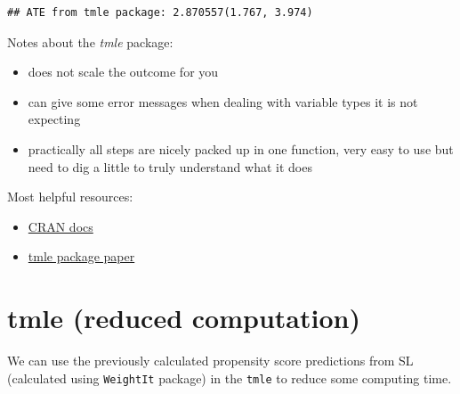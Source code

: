 \documentclass[
]{book}
\newenvironment{Shaded}{\begin{snugshade}}{\end{snugshade}}
\newcommand{\AttributeTok}[1]{\textcolor[rgb]{0.77,0.63,0.00}{#1}}
\newcommand{\FunctionTok}[1]{\textcolor[rgb]{0.00,0.00,0.00}{#1}}
\newcommand{\NormalTok}[1]{#1}
\newcommand{\OtherTok}[1]{\textcolor[rgb]{0.56,0.35,0.01}{#1}}
\newcommand{\SpecialCharTok}[1]{\textcolor[rgb]{0.00,0.00,0.00}{#1}}
\newcommand{\StringTok}[1]{\textcolor[rgb]{0.31,0.60,0.02}{#1}}
\providecommand{\tightlist}{%
  \setlength{\itemsep}{0pt}\setlength{\parskip}{0pt}}
\begin{document}
\begin{Shaded}
\end{Shaded}

\begin{verbatim}
## ATE from tmle package: 2.870557(1.767, 3.974)
\end{verbatim}

Notes about the \emph{tmle} package:

\begin{itemize}
\tightlist
\item
  does not scale the outcome for you
\item
  can give some error messages when dealing with variable types it is not expecting
\item
  practically all steps are nicely packed up in one function, very easy to use but need to dig a little to truly understand what it does
\end{itemize}

Most helpful resources:

\begin{itemize}
\tightlist
\item
  \href{https://cran.r-project.org/web/packages/tmle/tmle.pdf}{CRAN docs}
\item
  \href{https://www.jstatsoft.org/article/view/v051i13}{tmle package paper}
\end{itemize}

\hypertarget{tmle-reduced-computation}{%
\section{tmle (reduced computation)}\label{tmle-reduced-computation}}

We can use the previously calculated propensity score predictions from SL (calculated using \texttt{WeightIt} package) in the \texttt{tmle} to reduce some computing time.
\end{document}
